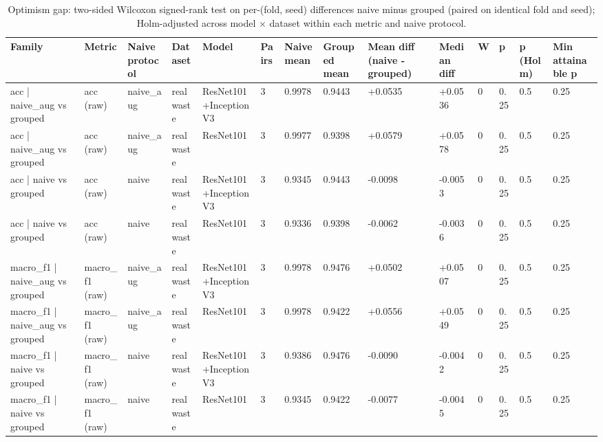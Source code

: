 \begin{table}[ht]
\centering
\small
\caption{Optimism gap: two-sided Wilcoxon signed-rank test on per-(fold, seed) differences naive minus grouped (paired on identical fold and seed); Holm-adjusted across model × dataset within each metric and naive protocol.}
\label{tab:tab2b_optimism_gap_wilcoxon}
\begin{tabular}{llllllllllllll}
\hline
Family & Metric & Naive protocol & Dataset & Model & Pairs & Naive mean & Grouped mean & Mean diff (naive - grouped) & Median diff & W & p & p (Holm) & Min attainable p \\
\hline
acc | naive\_aug vs grouped & acc (raw) & naive\_aug & realwaste & ResNet101+InceptionV3 & 3 & 0.9978 & 0.9443 & +0.0535 & +0.0536 & 0 & 0.25 & 0.5 & 0.25 \\
acc | naive\_aug vs grouped & acc (raw) & naive\_aug & realwaste & ResNet101 & 3 & 0.9977 & 0.9398 & +0.0579 & +0.0578 & 0 & 0.25 & 0.5 & 0.25 \\
acc | naive vs grouped & acc (raw) & naive & realwaste & ResNet101+InceptionV3 & 3 & 0.9345 & 0.9443 & -0.0098 & -0.0053 & 0 & 0.25 & 0.5 & 0.25 \\
acc | naive vs grouped & acc (raw) & naive & realwaste & ResNet101 & 3 & 0.9336 & 0.9398 & -0.0062 & -0.0036 & 0 & 0.25 & 0.5 & 0.25 \\
macro\_f1 | naive\_aug vs grouped & macro\_f1 (raw) & naive\_aug & realwaste & ResNet101+InceptionV3 & 3 & 0.9978 & 0.9476 & +0.0502 & +0.0507 & 0 & 0.25 & 0.5 & 0.25 \\
macro\_f1 | naive\_aug vs grouped & macro\_f1 (raw) & naive\_aug & realwaste & ResNet101 & 3 & 0.9978 & 0.9422 & +0.0556 & +0.0549 & 0 & 0.25 & 0.5 & 0.25 \\
macro\_f1 | naive vs grouped & macro\_f1 (raw) & naive & realwaste & ResNet101+InceptionV3 & 3 & 0.9386 & 0.9476 & -0.0090 & -0.0042 & 0 & 0.25 & 0.5 & 0.25 \\
macro\_f1 | naive vs grouped & macro\_f1 (raw) & naive & realwaste & ResNet101 & 3 & 0.9345 & 0.9422 & -0.0077 & -0.0045 & 0 & 0.25 & 0.5 & 0.25 \\
\hline
\end{tabular}
\end{table}